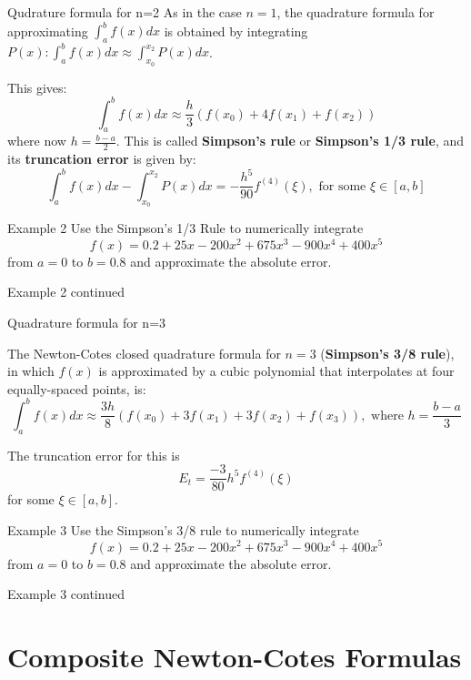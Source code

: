 \documentclass[12pt]{beamer}
\begin{document}
\begin{frame}{Qudrature formula for n=2} 
As in the case $n=1$, the quadrature formula for approximating $\int_a^{b} f(x)dx$ is obtained by integrating $P(x): \int_{a}^{b}f(x)dx \approx \int_{x_0}^{x_2}P(x)dx$. 

This gives: 
\[
   \int_{a}^{b} f(x)dx \approx \frac{h}{3}(f(x_0) + 4 f(x_1) + f(x_2))
\]
\noindent 
where now $h=\frac{b-a}{2}$. This is called {\bf Simpson's rule} or {\bf Simpson's 1/3 rule}, and its {\bf truncation error} is given by: 
\[
\int_{a}^{b}f(x)dx - \int_{x_0}^{x_2} P(x)dx = -\frac{h^5}{90} f^{(4)}(\xi), \mbox { for some } \xi \in [a,b] 
\]
\end{frame}

\begin{frame}{Example 2}
Use the Simpson's 1/3 Rule to numerically integrate \[f(x)=0.2+25x-200x^2+675x^3-900x^4+400x^5\] from $a=0$ to $b=0.8$ and approximate the absolute error.
\vspace{3 in}
\end{frame}

\begin{frame}{Example 2 continued}

\end{frame}

\begin{frame}{Quadrature formula for n=3} 

The Newton-Cotes closed quadrature formula for $n=3$ ({\bf Simpson's 3/8 rule}), in which $f(x)$
is approximated by a cubic polynomial that interpolates at four
equally-spaced points, is:
\[
\int_{a}^{b} f(x)dx \approx \frac{3h}{8} (f(x_0) + 3 f(x_1) + 3 f(x_2) + f(x_3)), 
\mbox { where } h = \frac{b-a}{3}
\]

The truncation error for this is
\[
E_t=\frac{-3}{80}h^5f^{(4)}(\xi)
\]
\noindent
for some $\xi \in [a,b]$.
\end{frame} 

\begin{frame}{Example 3}
Use the Simpson's 3/8 rule to numerically integrate \[f(x)=0.2+25x-200x^2+675x^3-900x^4+400x^5\] from $a=0$ to $b=0.8$ and approximate the absolute error.
\vspace{3 in}
\end{frame}

\begin{frame}{Example 3 continued}

\end{frame}
\section{Composite Newton-Cotes Formulas} 
\end{document}
